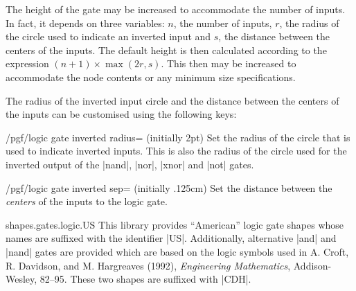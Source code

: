 The height of the gate may be increased to accommodate the number 
of inputs. In fact, it depends on three variables:
$n$, the number of inputs, $r$, the radius of the circle used
to indicate an inverted input and $s$, the distance between
the centers of the inputs.
The default height is then calculated according to the expression 
$(n+1)\times\max(2r,s)$. This then may
be increased to accommodate the node contents or any
minimum size specifications.

The radius of the inverted input circle and the distance between the 
centers of the inputs can be customised using the following keys:

\begin{key}{/pgf/logic gate inverted radius= (initially 2pt)}
  Set the radius of the circle that is used to indicate inverted
  inputs. This is also the radius of the circle used for the inverted
  output of the |nand|, |nor|, |xnor| and |not| gates. 
    
\begin{codeexample}[]
\end{codeexample} 
\end{key}

\begin{key}{/pgf/logic gate inverted sep= (initially .125cm)}
  Set the distance between the \emph{centers} of the inputs to the
  logic gate. 
  
\begin{codeexample}[]
\end{codeexample} 
\end{key}



\begin{pgflibrary}{shapes.gates.logic.US}
 This library provides ``American'' logic gate shapes whose names are 
  suffixed with the identifier |US|. Additionally,
  alternative |and| and |nand| gates are provided which are based on the 
  logic symbols used in A. Croft, R. Davidson, and M. Hargreaves (1992), 
  \emph{Engineering Mathematics}, Addison-Wesley, 82--95. These two 
  shapes are suffixed with |CDH|. 
\end{pgflibrary}

